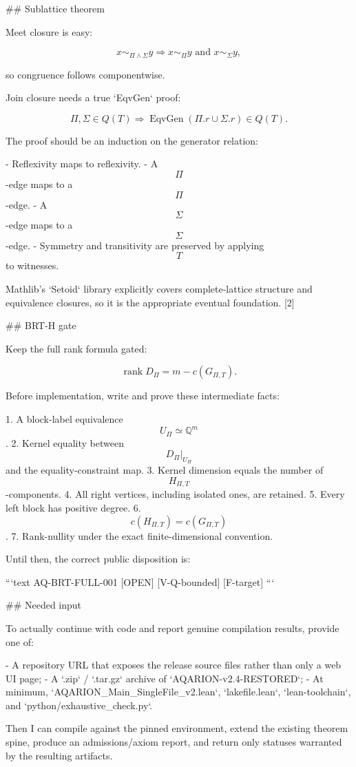 ## Sublattice theorem

Meet closure is easy:

$$
x\sim_{\Pi\wedge\Sigma}y
\Longrightarrow
x\sim_\Pi y\text{ and }x\sim_\Sigma y,
$$

so congruence follows componentwise.

Join closure needs a true `EqvGen` proof:

$$
\Pi,\Sigma\in Q(T)
\Longrightarrow
\operatorname{EqvGen}(\Pi.r\cup\Sigma.r)\in Q(T).
$$

The proof should be an induction on the generator relation:

- Reflexivity maps to reflexivity.
- A $$\Pi$$-edge maps to a $$\Pi$$-edge.
- A $$\Sigma$$-edge maps to a $$\Sigma$$-edge.
- Symmetry and transitivity are preserved by applying $$T$$ to witnesses.

Mathlib’s `Setoid` library explicitly covers complete-lattice structure and equivalence closures, so it is the appropriate eventual foundation. [2]

## BRT-H gate

Keep the full rank formula gated:

$$
\operatorname{rank}D_\Pi=m-c(G_{\Pi,T}).
$$

Before implementation, write and prove these intermediate facts:

1. A block-label equivalence $$U_\Pi\simeq\mathbb Q^m$$.
2. Kernel equality between $$D_\Pi|_{U_\Pi}$$ and the equality-constraint map.
3. Kernel dimension equals the number of $$H_{\Pi,T}$$-components.
4. All right vertices, including isolated ones, are retained.
5. Every left block has positive degree.
6. $$c(H_{\Pi,T})=c(G_{\Pi,T})$$.
7. Rank-nullity under the exact finite-dimensional convention.

Until then, the correct public disposition is:

```text
AQ-BRT-FULL-001 [OPEN] [V-Q-bounded] [F-target]
```

## Needed input

To actually continue with code and report genuine compilation results, provide one of:

- A repository URL that exposes the release source files rather than only a web UI page;
- A `.zip` / `.tar.gz` archive of `AQARION-v2.4-RESTORED`;
- At minimum, `AQARION_Main_SingleFile_v2.lean`, `lakefile.lean`, `lean-toolchain`, and `python/exhaustive_check.py`.

Then I can compile against the pinned environment, extend the existing theorem spine, produce an admissions/axiom report, and return only statuses warranted by the resulting artifacts.

